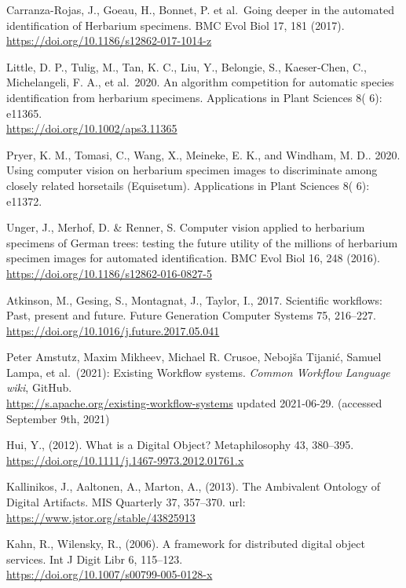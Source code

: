 \begin{thebibliography}{9}
 Carranza-Rojas, J., Goeau, H., Bonnet, P. et al.~Going deeper
in the automated identification of Herbarium specimens. BMC Evol Biol
17, 181 (2017).\\
\url{https://doi.org/10.1186/s12862-017-1014-z}

 Little, D. P., Tulig, M., Tan, K. C., Liu, Y., Belongie, S.,
Kaeser‐Chen, C., Michelangeli, F. A., et al.~2020. An algorithm
competition for automatic species identification from herbarium
specimens. Applications in Plant Sciences 8( 6): e11365.\\
\url{https://doi.org/10.1002/aps3.11365}

 Pryer, K. M., Tomasi, C., Wang, X., Meineke, E. K., and
Windham, M. D.. 2020. Using computer vision on herbarium specimen images
to discriminate among closely related horsetails (Equisetum).
Applications in Plant Sciences 8( 6): e11372.

 Unger, J., Merhof, D. \& Renner, S. Computer vision applied to
herbarium specimens of German trees: testing the future utility of the
millions of herbarium specimen images for automated identification. BMC
Evol Biol 16, 248 (2016).\\
\url{https://doi.org/10.1186/s12862-016-0827-5}

 Atkinson, M., Gesing, S., Montagnat, J., Taylor, I., 2017.
Scientific workflows: Past, present and future. Future Generation
Computer Systems 75, 216--227.\\
\url{https://doi.org/10.1016/j.future.2017.05.041}

 Peter Amstutz, Maxim Mikheev, Michael R. Crusoe, Nebojša
Tijanić, Samuel Lampa, et al.~(2021): Existing Workflow systems.
\emph{Common Workflow Language wiki}, GitHub.\\
\url{https://s.apache.org/existing-workflow-systems} updated 2021-06-29.
(accessed September 9th, 2021)

 Hui, Y., (2012). What is a Digital Object? Metaphilosophy 43,
380--395.\\
\url{https://doi.org/10.1111/j.1467-9973.2012.01761.x}

 Kallinikos, J., Aaltonen, A., Marton, A., (2013). The
Ambivalent Ontology of Digital Artifacts. MIS Quarterly 37, 357--370.
url:\\
\url{https://www.jstor.org/stable/43825913}

 Kahn, R., Wilensky, R., (2006). A framework for distributed
digital object services. Int J Digit Libr 6, 115--123.\\
\url{https://doi.org/10.1007/s00799-005-0128-x}


\end{thebibliography}
